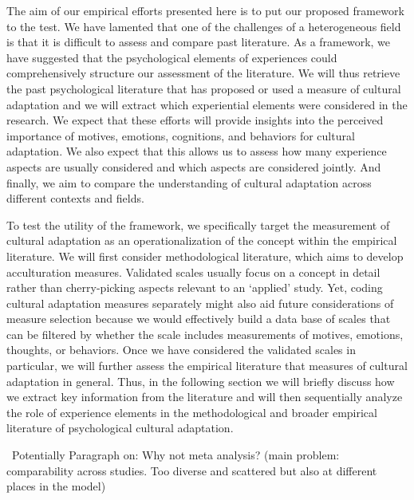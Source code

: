 \documentclass[man, 12pt, a4paper]{apa7}
\newcommand\Question[1][2ex]{%
  \renewcommand\stacktype{L}%
  \scaleto{\stackon[1.3pt]{\color{red}$\triangle$}{\tiny\bfseries ?}}{#1}}%
\begin{document}
The aim of our empirical efforts presented here is to put our proposed framework to the test. We have lamented that one of the challenges of a heterogeneous field is that it is difficult to assess and compare past literature. As a framework, we have suggested that the psychological elements of experiences could comprehensively structure our assessment of the literature. We will thus retrieve the past psychological literature that has proposed or used a measure of cultural adaptation and we will extract which experiential elements were considered in the research. We expect that these efforts will provide insights into the perceived importance of motives, emotions, cognitions, and behaviors for cultural adaptation. We also expect that this allows us to assess how many experience aspects are usually considered and which aspects are considered jointly. And finally, we aim to compare the understanding of cultural adaptation across different contexts and fields. 

To test the utility of the framework, we specifically target the measurement of cultural adaptation as an operationalization of the concept within the empirical literature. We will first consider methodological literature, which aims to develop acculturation measures. Validated scales usually focus on a concept in detail rather than cherry-picking aspects relevant to an `applied' study. Yet, coding cultural adaptation measures separately might also aid future considerations of measure selection because we would effectively build a data base of scales that can be filtered by whether the scale includes measurements of motives, emotions, thoughts, or behaviors. Once we have considered the validated scales in particular, we will further assess the empirical literature that measures of cultural adaptation in general. Thus, in the following section we will briefly discuss how we extract key information from the literature and will then sequentially analyze the role of experience elements in the methodological and broader empirical literature of psychological cultural adaptation.

\Question\ Potentially Paragraph on: Why not meta analysis? (main problem: comparability across studies. Too diverse and scattered but also at different places in the model)
\end{document}
